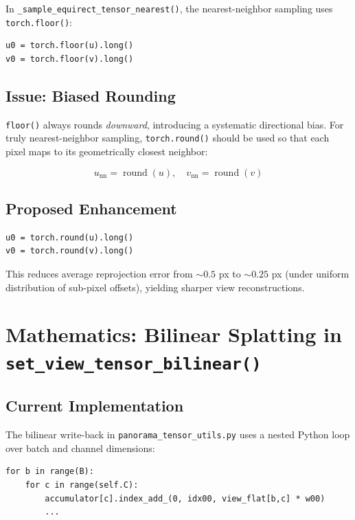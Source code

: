 \documentclass[11pt,a4paper]{article}
\newcommand{\file}[1]{\texttt{#1}}
\newcommand{\fn}[1]{\texttt{#1}}
\begin{document}
In \fn{\_sample\_equirect\_tensor\_nearest()}, the nearest-neighbor sampling uses \fn{torch.floor()}:
\begin{lstlisting}
u0 = torch.floor(u).long()
v0 = torch.floor(v).long()
\end{lstlisting}

\subsection{Issue: Biased Rounding}

\fn{floor()} always rounds \emph{downward}, introducing a systematic directional bias.
For truly nearest-neighbor sampling, \fn{torch.round()} should be used so that each pixel maps to its geometrically closest neighbor:

\begin{equation}
    u_{\text{nn}} = \operatorname{round}(u), \quad v_{\text{nn}} = \operatorname{round}(v)
\end{equation}

\subsection{Proposed Enhancement}
\begin{lstlisting}
u0 = torch.round(u).long()
v0 = torch.round(v).long()
\end{lstlisting}

This reduces average reprojection error from $\sim 0.5$ px to $\sim 0.25$ px (under uniform distribution of sub-pixel offsets), yielding sharper view reconstructions.

\section{Mathematics: Bilinear Splatting in \fn{set\_view\_tensor\_bilinear()}}

\subsection{Current Implementation}

The bilinear write-back in \file{panorama\_tensor\_utils.py} uses a nested Python loop over batch and channel dimensions:
\begin{lstlisting}
for b in range(B):
    for c in range(self.C):
        accumulator[c].index_add_(0, idx00, view_flat[b,c] * w00)
        ...
\end{lstlisting}
\end{document}
